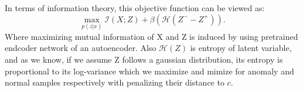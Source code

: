 \documentclass[a4]{article}
\newcommand{\information}{\mathcal{I}}
\begin{document}
In terms of information theory, this objective function can be viewed as: 
\begin{equation}
	\max_{p(z|x)} \information(X; Z) + \beta (\mathcal{H}(Z^- - Z^+)).
\end{equation}
Where maximizing mutual information of X and Z is induced by using pretrained endcoder network of an autoencoder. Also $\mathcal{H}(Z)$ is entropy of latent variable, and as we know, if we assume Z follows a gaussian distribution, its entropy is proportional to its log-variance which we maximize and mimize for anomaly and normal samples respectively with penalizing their distance to $c$.
\end{document}
